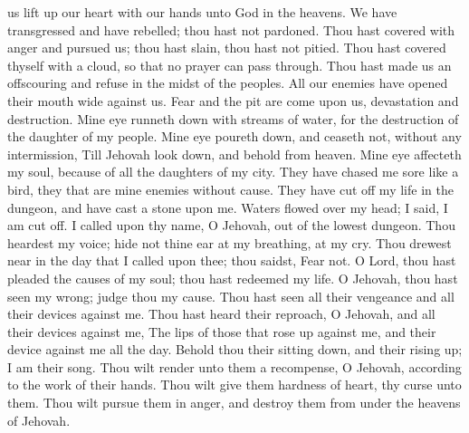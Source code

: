us lift up our heart with our hands unto God in the heavens.  We have transgressed and have rebelled; thou hast not pardoned.  Thou hast covered with anger and pursued us; thou hast slain, thou hast not pitied.  Thou hast covered thyself with a cloud, so that no prayer can pass through.  Thou hast made us an offscouring and refuse in the midst of the peoples.  All our enemies have opened their mouth wide against us.  Fear and the pit are come upon us, devastation and destruction.  Mine eye runneth down with streams of water, for the destruction of the daughter of my people.  Mine eye poureth down, and ceaseth not, without any intermission,  Till Jehovah look down, and behold from heaven.  Mine eye affecteth my soul, because of all the daughters of my city.  They have chased me sore like a bird, they that are mine enemies without cause.  They have cut off my life in the dungeon, and have cast a stone upon me.  Waters flowed over my head; I said, I am cut off.  I called upon thy name, O Jehovah, out of the lowest dungeon.  Thou heardest my voice; hide not thine ear at my breathing, at my cry.  Thou drewest near in the day that I called upon thee; thou saidst, Fear not.  O Lord, thou hast pleaded the causes of my soul; thou hast redeemed my life.  O Jehovah, thou hast seen my wrong; judge thou my cause.  Thou hast seen all their vengeance and all their devices against me.  Thou hast heard their reproach, O Jehovah, and all their devices against me,  The lips of those that rose up against me, and their device against me all the day.  Behold thou their sitting down, and their rising up; I am their song.  Thou wilt render unto them a recompense, O Jehovah, according to the work of their hands.  Thou wilt give them hardness of heart, thy curse unto them.  Thou wilt pursue them in anger, and destroy them from under the heavens of Jehovah. 


